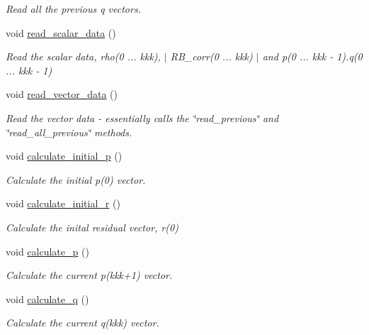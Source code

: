 \begin{DoxyCompactItemize}
\begin{DoxyCompactList}\small\item\em Read all the previous {\ttfamily q} vectors. \end{DoxyCompactList}\item 
void \hyperlink{classcarl_1_1_f_e_t_i___operations_a27cc382607116e63781e803c0491d581}{read\+\_\+scalar\+\_\+data} ()
\begin{DoxyCompactList}\small\item\em Read the scalar data, {\ttfamily rho(0 ... kkk)}, {\ttfamily $\vert$ R\+B\+\_\+corr(0 ... kkk) $\vert$} and {\ttfamily p(0 ... kkk -\/ 1).q(0 ... kkk -\/ 1)} \end{DoxyCompactList}\item 
void \hyperlink{classcarl_1_1_f_e_t_i___operations_a8abe893893239a353379bc843895b9c7}{read\+\_\+vector\+\_\+data} ()
\begin{DoxyCompactList}\small\item\em Read the vector data -\/ essentially calls the \char`\"{}read\+\_\+previous\char`\"{} and \char`\"{}read\+\_\+all\+\_\+previous\char`\"{} methods. \end{DoxyCompactList}\item 
void \hyperlink{classcarl_1_1_f_e_t_i___operations_af84b7a871c2d8937b640b7e665d51a5f}{calculate\+\_\+initial\+\_\+p} ()
\begin{DoxyCompactList}\small\item\em Calculate the initial {\ttfamily p(0)} vector. \end{DoxyCompactList}\item 
void \hyperlink{classcarl_1_1_f_e_t_i___operations_a6d7e107e98a08d9abc351a9cddc37871}{calculate\+\_\+initial\+\_\+r} ()
\begin{DoxyCompactList}\small\item\em Calculate the inital residual vector, {\ttfamily r(0)} \end{DoxyCompactList}\item 
void \hyperlink{classcarl_1_1_f_e_t_i___operations_a1a74744d91b5feaac0166e86a7a83d2d}{calculate\+\_\+p} ()
\begin{DoxyCompactList}\small\item\em Calculate the current {\ttfamily p(kkk+1)} vector. \end{DoxyCompactList}\item 
void \hyperlink{classcarl_1_1_f_e_t_i___operations_a22676b60194c70580d866d796e6a67a6}{calculate\+\_\+q} ()
\begin{DoxyCompactList}\small\item\em Calculate the current {\ttfamily q(kkk)} vector. \end{DoxyCompactList}\item 

\end{DoxyCompactItemize}
